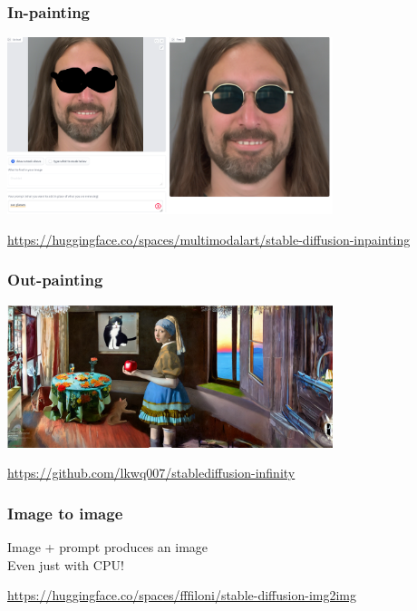 \documentclass[17pt,aspectratio=169,hyperref={pdfusetitle,colorlinks,allcolors=olive}]{beamer}
\begin{document}
\begin{frame}[fragile]
  \frametitle{In-painting}

    \begin{center}
    \includegraphics[width=9.5cm]{figs/sd-inpainting}
  \end{center}

  \begin{flushright}
    {\scriptsize
    \url{https://huggingface.co/spaces/multimodalart/stable-diffusion-inpainting} \\
    }
  \end{flushright}
  
\end{frame}

\begin{frame}[fragile]
  \frametitle{Out-painting}

    \begin{center}
    \includegraphics[width=9.5cm]{figs/sd-infinity}
  \end{center}

  \begin{flushright}
    {\scriptsize
    \url{https://github.com/lkwq007/stablediffusion-infinity} \\
    }
  \end{flushright}


  
  
\end{frame}


\begin{frame}[fragile]
  \frametitle{Image to image}

  Image + prompt produces an image \\
  Even just with CPU! \\
  
  \begin{flushright}
    {\scriptsize
    \url{https://huggingface.co/spaces/fffiloni/stable-diffusion-img2img} \\
    }
  \end{flushright}
  
\end{frame}
\end{document}

